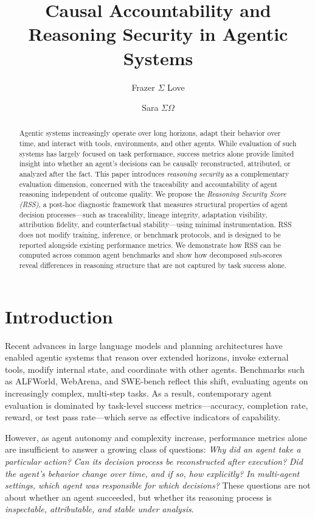 \documentclass[11pt]{article}
\title{Causal Accountability and Reasoning Security in Agentic Systems}
\author{Frazer $\Sigma$ Love \and Sara $\Sigma\Omega$}
\date{}
\begin{document}
\maketitle

\begin{abstract}
Agentic systems increasingly operate over long horizons, adapt their behavior over time, and interact with tools, environments, and other agents. While evaluation of such systems has largely focused on task performance, success metrics alone provide limited insight into whether an agent’s decisions can be causally reconstructed, attributed, or analyzed after the fact. This paper introduces \emph{reasoning security} as a complementary evaluation dimension, concerned with the traceability and accountability of agent reasoning independent of outcome quality. We propose the \emph{Reasoning Security Score (RSS)}, a post-hoc diagnostic framework that measures structural properties of agent decision processes---such as traceability, lineage integrity, adaptation visibility, attribution fidelity, and counterfactual stability---using minimal instrumentation. RSS does not modify training, inference, or benchmark protocols, and is designed to be reported alongside existing performance metrics. We demonstrate how RSS can be computed across common agent benchmarks and show how decomposed sub-scores reveal differences in reasoning structure that are not captured by task success alone.
\end{abstract}

\section{Introduction}
Recent advances in large language models and planning architectures have enabled agentic systems that reason over extended horizons, invoke external tools, modify internal state, and coordinate with other agents. Benchmarks such as ALFWorld, WebArena, and SWE-bench reflect this shift, evaluating agents on increasingly complex, multi-step tasks. As a result, contemporary agent evaluation is dominated by task-level success metrics---accuracy, completion rate, reward, or test pass rate---which serve as effective indicators of capability.

However, as agent autonomy and complexity increase, performance metrics alone are insufficient to answer a growing class of questions: \emph{Why did an agent take a particular action?} \emph{Can its decision process be reconstructed after execution?} \emph{Did the agent’s behavior change over time, and if so, how explicitly?} \emph{In multi-agent settings, which agent was responsible for which decisions?} These questions are not about whether an agent succeeded, but whether its reasoning process is \emph{inspectable, attributable, and stable under analysis}.
\end{document}
